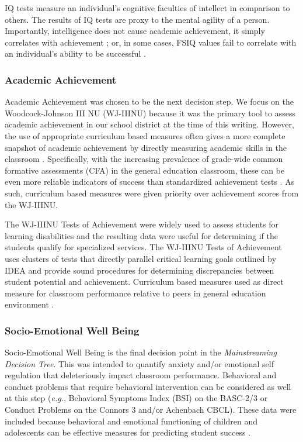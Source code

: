 \documentclass[twoside]{article}
\begin{document}
IQ tests measure an individual's cognitive faculties of intellect in comparison to others. The results of IQ tests are proxy to the mental agility of a person. Importantly, intelligence does not cause academic achievement, it simply correlates with achievement \parencite{konold1997factor,wechsler2008wechsler}; or, in some cases, FSIQ values fail to correlate with an individual's ability to be successful \parencite{biswas2016cognitive,dennis2009iq,popa2014atypical,nader2014does}.

\subsubsection{Academic Achievement}
Academic Achievement was chosen to be the next decision step. We focus on the Woodcock-Johnson III NU (WJ-IIINU) because it was the primary tool to assess academic achievement in our school district at the time of this writing. However, the use of appropriate curriculum based measures often gives a more complete snapshot of academic achievement by directly measuring academic skills in the classroom \parencite{mathes1998preparing}. Specifically, with the increasing prevalence of grade-wide common formative assessments (CFA) in the general education classroom, these can be even more reliable indicators of success than standardized achievement tests \parencite{dunn2009critical,heritage2007formative,mathes1998preparing}. As such, curriculum based measures were given priority over achievement scores from the WJ-IIINU.

The WJ-IIINU Tests of Achievement were widely used to assess students for learning disabilities and the resulting data were useful for determining if the students qualify for specialized services. The WJ-IIINU Tests of Achievement uses clusters of tests that directly parallel critical learning goals outlined by IDEA and provide sound procedures for determining discrepancies between student potential and achievement. Curriculum based measures used as direct measure for classroom performance relative to peers in general education environment \parencite{edwards2006factorial,taub2004confirmatory,wu2008short}.

\subsubsection{Socio-Emotional Well Being}
Socio-Emotional Well Being is the final decision point in the \textit{Mainstreaming Decision Tree}. This was intended to quantify anxiety and/or emotional self regulation that deleteriously impact classroom performance. Behavioral and conduct problems that require behavioral intervention can be considered as well at this step (\textit{e.g.}, Behavioral Symptoms Index (BSI) on the BASC-2/3 or Conduct Problems on the Connors 3 and/or Achenbach CBCL). These data were included because behavioral and emotional functioning of children and adolescents can be effective measures for predicting student success \parencite{wiesner2013exploratory}. 
\end{document}
